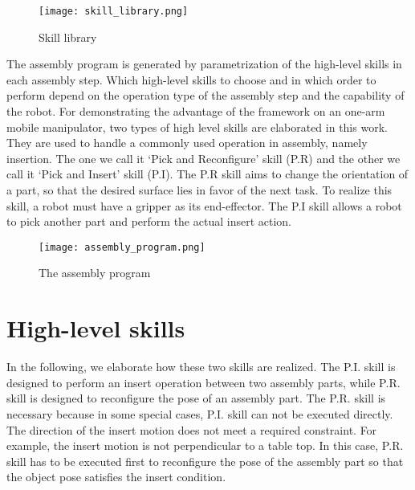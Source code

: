 \begin{figure}[!htbp]
\centering
\texttt{[image: skill\_library.png]}
\captionsetup{justification=raggedright}
\caption{Skill library}
\label{fig:skill_library}  %
\end{figure} 

The assembly program is generated by parametrization of the high-level skills in each assembly step. Which high-level skills to choose and in which order to perform depend on the operation type of the assembly step and the capability of the robot. For demonstrating the advantage of the framework on an one-arm mobile manipulator, two types of high level skills are elaborated in this work. They are used to handle a commonly used operation in assembly, namely insertion. The one we call it `Pick and Reconfigure' skill (P.R) and the other we call it `Pick and Insert' skill (P.I). The P.R skill aims to change the orientation of a part, so that the desired surface lies in favor of the next task. To realize this skill, a robot must have a gripper as its end-effector. The P.I skill allows a robot to pick another part and perform the actual insert action.
\begin{figure}[!htbp]
\centering
\texttt{[image: assembly\_program.png]}
\captionsetup{justification=raggedright}
\caption{The assembly program}
\label{fig:assembly_program}  %
\end{figure}


\section{High-level skills}



In the following, we elaborate how these two skills are realized. The P.I. skill is designed to perform an insert operation between two assembly parts, while P.R. skill is designed to reconfigure the pose of an assembly part. The P.R. skill is necessary because in some special cases, P.I. skill can not be executed directly. The direction of the insert motion does not meet a required constraint. For example, the insert motion is not perpendicular to a table top. In this case, P.R. skill has to be executed first to reconfigure the pose of the assembly part so that the object pose satisfies the insert condition.  

